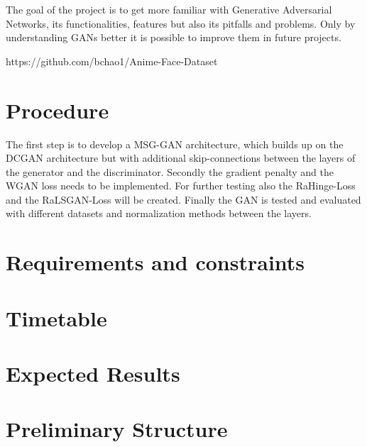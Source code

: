 \documentclass[conference,onecolumn,compsoc]{IEEEtran}
\begin{document}
\noindent
The goal of the project is to get more familiar with Generative Adversarial Networks, its functionalities, features but also its pitfalls and problems. Only by understanding GANs better it is possible to improve them in future projects.

https://github.com/bchao1/Anime-Face-Dataset


\section{Procedure}

\noindent
The first step is to develop a MSG-GAN \cite{karnewar2020msggan} architecture, which builds up on the DCGAN \cite{radford2016unsupervised} architecture but with additional skip-connections between the layers of the generator and the discriminator. Secondly the gradient penalty and the WGAN loss needs to be implemented. For further testing also the RaHinge-Loss and the RaLSGAN-Loss will be created. Finally the GAN is tested and evaluated with different datasets and normalization methods between the layers.

\section{Requirements and constraints}

\blindtext

\section{Timetable}

\noindent
\blindtext \cite{yazıcı2019unusual}

\section{Expected Results}

\noindent
\blindtext


\section{Preliminary  Structure}
\end{document}
